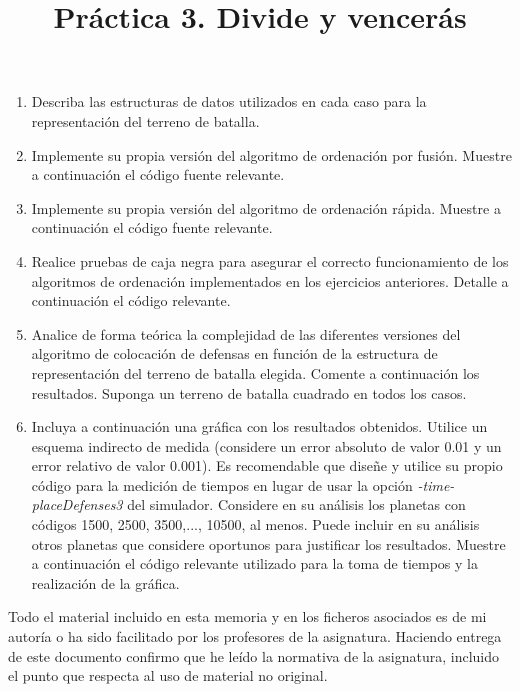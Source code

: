 \documentclass[]{article}
\title{Práctica 3. Divide y vencerás}
\author{}
\begin{document}
\maketitle


%

\begin{enumerate}
\item Describa las estructuras de datos utilizados en cada caso para la representación del terreno de batalla. 



\item Implemente su propia versión del algoritmo de ordenación por fusión. Muestre a continuación el código fuente relevante. 




\item Implemente su propia versión del algoritmo de ordenación rápida. Muestre a continuación el código fuente relevante. 



\item Realice pruebas de caja negra para asegurar el correcto funcionamiento de los algoritmos de ordenación implementados en los ejercicios anteriores. Detalle a continuación el código relevante.



\item Analice de forma teórica la complejidad de las diferentes versiones del algoritmo de colocación de defensas en función de la estructura de representación del terreno de batalla elegida. Comente a continuación los resultados. Suponga un terreno de batalla cuadrado en todos los casos. 



\item Incluya a continuación una gráfica con los resultados obtenidos. Utilice un esquema indirecto de medida (considere un error absoluto de valor 0.01 y un error relativo de valor 0.001). Es recomendable que diseñe y utilice su propio código para la medición de tiempos en lugar de usar la opción \emph{-time-placeDefenses3} del simulador. Considere en su análisis los planetas con códigos 1500, 2500, 3500,..., 10500, al menos. Puede incluir en su análisis otros planetas que considere oportunos para justificar los resultados. Muestre a continuación el código relevante utilizado para la toma de tiempos y la realización de la gráfica.



\end{enumerate}

Todo el material incluido en esta memoria y en los ficheros asociados es de mi autoría o ha sido facilitado por los profesores de la asignatura. Haciendo entrega de este documento confirmo que he leído la normativa de la asignatura, incluido el punto que respecta al uso de material no original.
\end{document}
